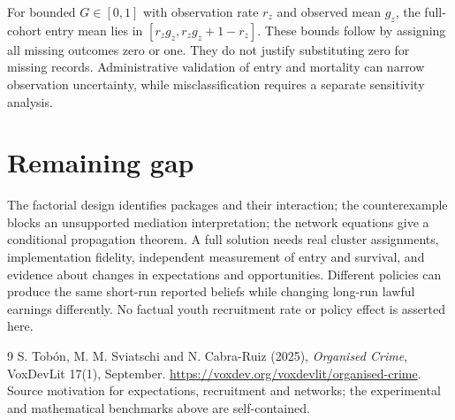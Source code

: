 \documentclass[11pt,a4paper]{article}
\begin{document}
For bounded $G\in[0,1]$ with observation rate $r_z$ and observed mean $g_z$, the full-cohort entry mean lies in $[r_zg_z,r_zg_z+1-r_z]$. These bounds follow by assigning all missing outcomes zero or one. They do not justify substituting zero for missing records. Administrative validation of entry and mortality can narrow observation uncertainty, while misclassification requires a separate sensitivity analysis.

\section{Remaining gap}
The factorial design identifies packages and their interaction; the counterexample blocks an unsupported mediation interpretation; the network equations give a conditional propagation theorem. A full solution needs real cluster assignments, implementation fidelity, independent measurement of entry and survival, and evidence about changes in expectations and opportunities. Different policies can produce the same short-run reported beliefs while changing long-run lawful earnings differently. No factual youth recruitment rate or policy effect is asserted here.
\begin{thebibliography}{9}
 S. Tob\'on, M. M. Sviatschi and N. Cabra-Ruiz (2025), \emph{Organised Crime}, VoxDevLit 17(1), September. \url{https://voxdev.org/voxdevlit/organised-crime}. Source motivation for expectations, recruitment and networks; the experimental and mathematical benchmarks above are self-contained.
\end{thebibliography}
\end{document}
